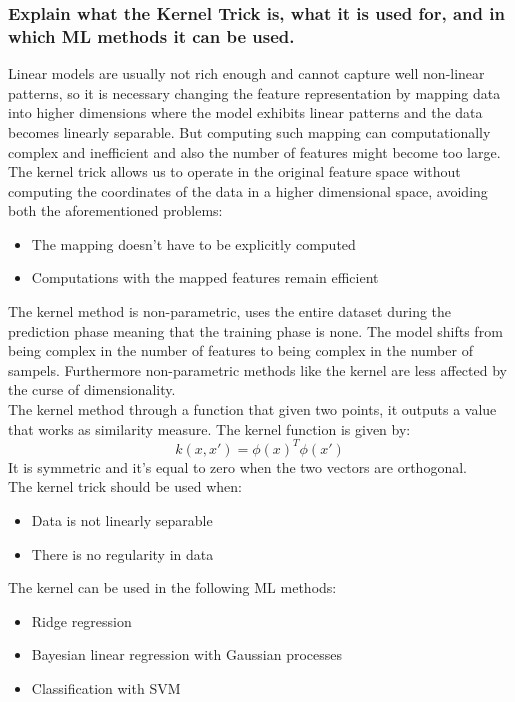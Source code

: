 \subsubsection{Explain what the Kernel Trick is, what it is used for, and in which ML methods it can be used.}
    Linear models are usually not rich enough and cannot capture well non-linear patterns, so it is necessary changing the feature representation by mapping data into higher dimensions where the model exhibits linear patterns and the data becomes linearly separable. But computing such mapping can computationally complex and inefficient and also the number of features might become too large.\\
    The kernel trick allows us to operate in the original feature space without computing the coordinates of the data in a higher dimensional space, avoiding both the aforementioned problems:
    \begin{itemize}
        \item The mapping doesn't have to be explicitly computed
        \item Computations with the mapped features remain efficient
    \end{itemize}
    The kernel method is non-parametric, uses the entire dataset during the prediction phase meaning that the training phase is none. The model shifts from being complex in the number of features to being complex in the number of sampels. Furthermore non-parametric methods like the kernel are less affected by the curse of dimensionality.\\
    The kernel method through a function that given two points, it outputs a value that works as similarity measure. The kernel function is given by:
    $$k(x,x')=\phi(x)^T\phi(x')$$
    It is symmetric and it's equal to zero when the two vectors are orthogonal.\\
    The kernel trick should be used when:
    \begin{itemize}
        \item Data is not linearly separable
        \item There is no regularity in data
    \end{itemize}
    The kernel can be used in the following ML methods:
    \begin{itemize}
        \item Ridge regression
        \item Bayesian linear regression with Gaussian processes
        \item Classification with SVM
    \end{itemize}

